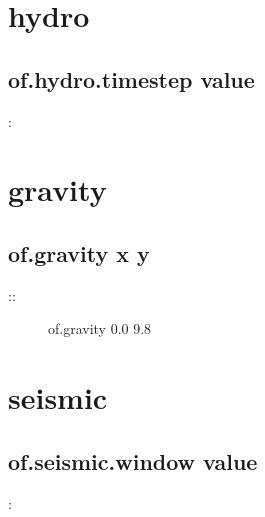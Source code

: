 \documentclass[letterpaper,10pt,english]{sphinxmanual}
\begin{document}
\chapter{hydro}
\label{\detokenize{rst_tutorials/command_line_guide:id5}}

\section{of.hydro.timestep value}
\label{\detokenize{rst_tutorials/command_line_guide:of-hydro-timestep-value}}
:

\begin{sphinxVerbatim}[commandchars=\\\{\}]
 
 
 
 
\end{sphinxVerbatim}


\chapter{gravity}
\label{\detokenize{rst_tutorials/command_line_guide:gravity}}

\section{of.gravity x y}
\label{\detokenize{rst_tutorials/command_line_guide:of-gravity-x-y}}\begin{description}
\item[{::}] \leavevmode
of.gravity 0.0 \sphinxhyphen{}9.8

\end{description}


\chapter{seismic}
\label{\detokenize{rst_tutorials/command_line_guide:seismic}}

\section{of.seismic.window value}
\label{\detokenize{rst_tutorials/command_line_guide:of-seismic-window-value}}
:
\end{document}
